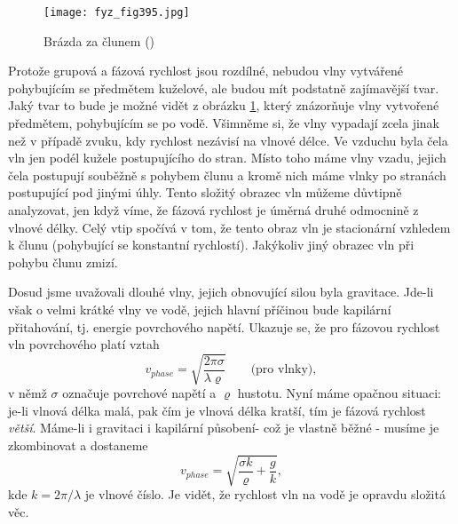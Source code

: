   \begin{figure}[ht!] %
    \centering
    \texttt{[image: fyz\_fig395.jpg]}
    \caption{Brázda za člunem
             (\cite[s.~696]{Feynman01})}
    \label{fyz:fig395}
  \end{figure}
  
  Protože grupová a fázová rychlost jsou rozdílné, nebudou vlny vytvářené pohybujícím se předmětem 
  kuželové, ale budou mít podstatně zajímavější tvar. Jaký tvar to bude je možné vidět z obrázku 
  \ref{fyz:fig395}, který znázorňuje vlny vytvořené předmětem, pohybujícím se po vodě. Všimněme si, 
  že vlny vypadají zcela jinak než v případě zvuku, kdy rychlost nezávisí na vlnové délce. Ve 
  vzduchu byla čela vln jen podél kužele postupujícího do stran. Místo toho máme vlny vzadu, jejich 
  čela postupují souběžně s pohybem člunu a kromě nich máme vlnky po stranách postupující pod 
  jinými úhly. Tento složitý obrazec vln můžeme důvtipně analyzovat, jen když víme, že fázová 
  rychlost je úměrná druhé odmocnině z vlnové délky. Celý vtip spočívá v tom, že tento obraz vln je 
  stacionární vzhledem k člunu (pohybující se konstantní rychlostí). Jakýkoliv jiný obrazec vln při 
  pohybu člunu zmizí.
  
  Dosud jsme uvažovali dlouhé vlny, jejich obnovující silou byla gravitace. Jde-li však o velmi 
  krátké vlny ve vodě, jejich hlavní příčinou bude kapilární přitahování, tj. energie povrchového 
  napětí. Ukazuje se, že pro fázovou rychlost vln povrchového platí vztah
  \begin{equation*}
    v_{phase} = \sqrt{\dfrac{2\pi\sigma}{\lambda\varrho}}\qquad\text{(pro vlnky)},
  \end{equation*}
  v němž \(\sigma\) označuje povrchové napětí a \(\varrho\) hustotu. Nyní máme opačnou situaci: 
  je-li vlnová délka malá, pak čím je vlnová délka kratší, tím je fázová rychlost \emph{větší}. 
  Máme-li i gravitaci i kapilární působení- což je vlastně běžné - musíme je zkombinovat a dostaneme
  \begin{equation*}
    v_{phase} = \sqrt{\dfrac{\sigma k}{\varrho} + \dfrac{g}{k}},
  \end{equation*}
  kde \(k = 2\pi/\lambda\) je vlnové číslo. Je vidět, že rychlost vln na vodě je opravdu složitá 
  věc.

